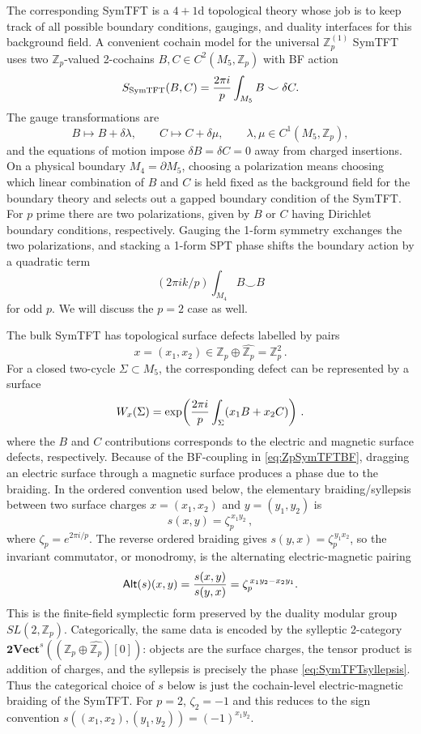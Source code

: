 \documentclass[aps,twocolumn,prx,floatfix,preprintnumbers, nofootinbib,10pt]{revtex4-2}
\numberwithin{equation}{section}
\theoremstyle{definition}
\theoremstyle{remark}
\theoremstyle{claim}
\newcommand{\be}{\begin{equation}}
\newcommand{\ee}{\end{equation}}
\newcommand{\Z}{{\mathbb Z}}
\newcommand{\bVect}{\mathbf{2Vect}}
\begin{document}
The corresponding
SymTFT is a $4+1$d topological theory whose job is to keep track of all
possible boundary conditions, gaugings, and duality interfaces for this
background field.  A convenient cochain model for the universal
$\Z_p^{(1)}$ SymTFT uses two $\Z_p$-valued 2-cochains $B,C\in C^2(M_5,\Z_p)$
with BF action
\be\label{eq:ZpSymTFTBF}
  S_{\rm SymTFT}(B,C)
  ={2\pi i\over p}\int_{M_5} B\smile\delta C .
\ee
The gauge transformations are
\be
  B\mapsto B+\delta\lambda,\qquad C\mapsto C+\delta\mu,
  \qquad \lambda,\mu\in C^1(M_5,\Z_p),
\ee
and the equations of motion impose $\delta B=\delta C=0$ away from charged
insertions.  
On a physical boundary $M_4=\partial M_5$, choosing a
polarization means choosing which linear combination of $B$ and $C$ is held
fixed as the background field for the boundary theory and selects out a gapped boundary condition of the SymTFT. 
For $p$ prime there are two polarizations, given by $B$ or $C$ having Dirichlet boundary conditions, respectively. 
Gauging the 1-form symmetry exchanges the two polarizations, and stacking a 1-form SPT phase shifts
the boundary action by a quadratic term 
\be 
(2\pi i k/p)\int_{M_4}B\smile B
\ee
for odd $p$. We will discuss the $p=2$ case as well. 

\smallskip
{}
The bulk SymTFT has topological surface defects labelled by pairs
\be
  x=(x_1,x_2)\in \Z_p\oplus\widehat{\Z_p} = \Z_p^2\,.
\ee
For a closed two-cycle $\Sigma\subset M_5$, the corresponding defect can be
represented by a surface 
\be
  W_x(\Sigma)
  =
  \exp\!\left({2\pi i\over p}\int_\Sigma (x_1B+x_2C)\right)\,.
\ee
where the $B$ and $C$ contributions corresponds to the electric and magnetic surface defects, respectively. 
 Because of the BF-coupling in
\eqref{eq:ZpSymTFTBF}, dragging an electric surface through a magnetic surface
produces a phase due to the braiding.
In the ordered convention used below,
the elementary braiding/syllepsis between two surface charges
$x=(x_1,x_2)$ and $y=(y_1,y_2)$ is
\be\label{eq:SymTFTsyllepsis}
  s(x,y)=\zeta_p^{\,x_1y_2}\,,
\ee
where $\zeta_p= e^{2 \pi i/p}$.
The reverse ordered braiding gives $s(y,x)=\zeta_p^{\,y_1x_2}$, so the invariant
commutator, or monodromy, is the alternating electric-magnetic pairing
\be\label{eq:SymTFTAlt}
  \mathsf{Alt}(s)(x,y)
  ={s(x,y)\over s(y,x)}
  =\zeta_p^{\,x_1y_2-x_2y_1}.
\ee
This is the finite-field symplectic form preserved by the duality modular group
$SL(2,\Z_p)$.  Categorically, the same data is encoded
by the sylleptic 2-category
$\bVect^s((\Z_p\oplus\widehat{\Z_p})[0])$: objects are the surface charges,
the tensor product is addition of charges, and the syllepsis is precisely the
phase \eqref{eq:SymTFTsyllepsis}.  Thus the categorical choice of $s$ below is
just the cochain-level electric-magnetic braiding of the SymTFT.  For $p=2$,
$\zeta_2=-1$ and this reduces to the sign convention
$s((x_1,x_2),(y_1,y_2))=(-1)^{x_1y_2}$.
\end{document}
